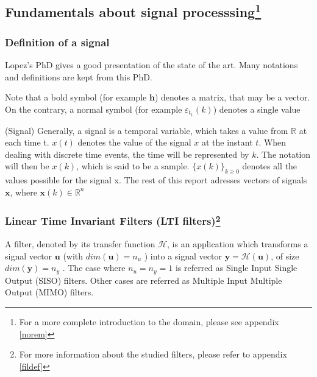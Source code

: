 	\subsection[Fundamentals about signal processing]{Fundamentals about signal processsing\footnote{For a more complete introduction to the domain, please see appendix \ref{norem}} }
	\subsubsection{Definition of a signal}
	Lopez's PhD \cite{lopez} gives a good presentation of the state of the art.
	Many notations and definitions are kept from this PhD.

	Note that a bold symbol (for example $\boldsymbol{h}$) denotes a matrix, that may be a vector.
	On the contrary, a normal symbol (for example $\varepsilon_{t_1}(k)$) denotes a single value

	\begin{thdef}\label{sig} (Signal)
		Generally, a signal is a temporal variable, which takes a value from $\mathbb{R}$ at each time t.
		$x(t)$ denotes the value of the signal $x$ at the instant $t$.
		When dealing with discrete time events, the time will be represented by $k$.
		The notation will then be $x(k)$, which is said to be a sample.
		$\{x(k)\}_{k \geq 0}$ denotes all the values possible for the signal x.
		The rest of this report adresses vectors of signals $\textbf{x}$, where $\textbf{x}(k) \in \mathbb{R}^{n}$
	\end{thdef}


	\subsubsection[Linear Time Invariant Filters (LTI Filters)]{Linear Time Invariant Filters (LTI filters)\footnote{For more information about the studied filters, please refer to appendix \ref{fildef}}}
	A filter, denoted by its transfer function $\mathcal{H}$, is an application which transforms a signal vector $\boldsymbol{u}$ (with $dim(\boldsymbol{u}) = n_u$ )
	into a signal vector $\boldsymbol{y} = \mathcal{H}(\boldsymbol{u})$, of size $dim(\boldsymbol{y}) = n_y$ . The case where $n_u = n_y = 1$ is referred as Single Input Single Output
	(SISO) filters. Other cases are referred as Multiple Input Multiple Output (MIMO) filters.

